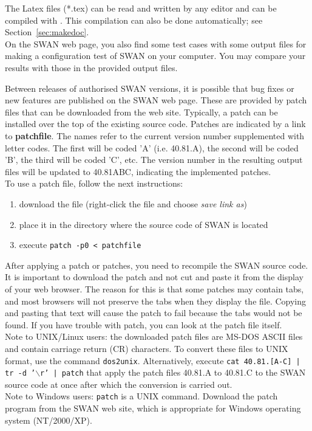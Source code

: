\documentclass[12pt]{book}
\begin{document}
\noindent
The Latex files (*.tex) can be read and written by any editor and can be compiled with \LaTeXe.
This compilation can also be done automatically; see Section~\ref{sec:makedoc}.
\\[2ex]
\noindent
On the SWAN web page, you also find some test cases with some output files for making a
configuration test of SWAN on your computer. You may compare your results with those in
the provided output files.

 \label{ch:patch}

Between releases of authorised SWAN versions, it is possible that bug fixes or new
features are published on the SWAN web page. These are provided by patch files that can
be downloaded from the web site. Typically, a patch can be installed over the top of the
existing source code. Patches are indicated by a link to {\bf patchfile}. The names
refer to the current version number supplemented with letter codes. The first will be
coded 'A' (i.e. 40.81.A), the second will be coded 'B', the third will be coded 'C', etc.
The version number in the resulting output files will be updated to 40.81ABC, indicating
the implemented patches.
\\[2ex]
\noindent
To use a patch file, follow the next instructions:
\begin{enumerate}
  \item download the file (right-click the file and choose {\it save link as})
  \item place it in the directory where the source code of SWAN is located
  \item execute {\tt patch -p0 < patchfile}
\end{enumerate}
After applying a patch or patches, you need to recompile the SWAN source code.
\\[2ex]
\noindent
It is important to download the patch and not cut and paste it from the display
of your web browser. The reason for this is that some patches may contain tabs,
and most browsers will not preserve the tabs when they display the file. Copying
and pasting that text will cause the patch to fail because the tabs would not be
found. If you have trouble with patch, you can look at the patch file itself.
\\[2ex]
\noindent
Note to UNIX/Linux users:
the downloaded patch files are MS-DOS ASCII files and contain carriage return (CR) characters.
To convert these files to  UNIX format, use the command {\tt dos2unix}. Alternatively,
execute {\tt cat 40.81.[A-C] | tr -d '$\backslash$r' | patch} that apply the patch files
40.81.A to 40.81.C to the SWAN source code at once after which the conversion is
carried out.
\\[2ex]
\noindent
Note to Windows users: {\tt patch} is a UNIX command. Download the patch program
from the SWAN web site, which is appropriate for Windows operating system (NT/2000/XP).
\end{document}
